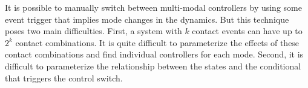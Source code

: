 
It is possible to manually switch between multi-modal controllers by using some
event trigger that implies mode changes in the dynamics. But this technique
poses two main difficulties. First, a system with $k$ contact events can have up
to $2^k$ contact combinations. It is quite difficult to parameterize the effects
of these contact combinations and find individual controllers for each mode.
Second, it is difficult to parameterize the relationship between the states and
the conditional that triggers the control switch. 
